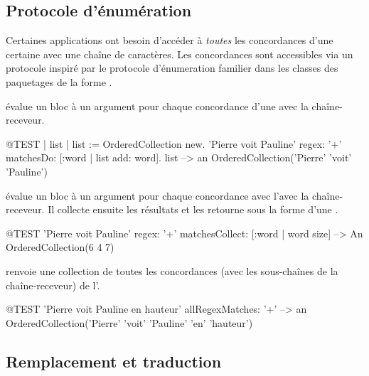 \documentclass[a4paper,10pt,twoside]{book}
\begin{document}
\subsection{Protocole d'énumération}

Certaines applications ont besoin d'accéder à \emph{toutes} les
concordances d'une certaine \expreg avec une chaîne de caractères.
Les concordances sont accessibles via un protocole inspiré par le
protocole d'énumeration 
familier dans les classes des paquetages de la forme .

 évalue un bloc à un argument pour
chaque concordance d'une \expreg avec la chaîne-receveur.

\begin{code}{@TEST | list |}
list := OrderedCollection new.
'Pierre voit Pauline' regex: '\w+' matchesDo: [:word | list add: word].
list --> an OrderedCollection('Pierre' 'voit' 'Pauline')
\end{code}

 évalue un bloc à un argument
pour chaque concordance avec l'\expreg avec la chaîne-receveur. Il
collecte ensuite les résultats et les retourne sous la forme d'une
 .

\begin{code}{@TEST}
'Pierre voit Pauline' regex: '\w+' matchesCollect: [:word | word size]                          --> An OrderedCollection(6 4 7)
\end{code}

 renvoie une collection de toutes les
concordances (avec les sous-chaînes de la chaîne-receveur) de l'\expreg.

\begin{code}{@TEST}
'Pierre voit Pauline en hauteur' allRegexMatches: '\w+' --> an OrderedCollection('Pierre' 'voit' 'Pauline' 'en' 'hauteur')
\end{code}

\subsection{Remplacement et traduction}
\end{document}
